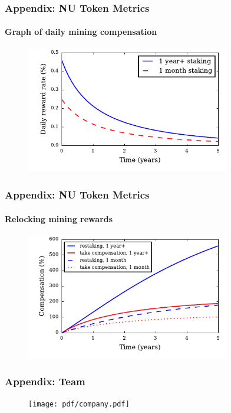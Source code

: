 \documentclass[xetex,mathsans,sans,aspectratio=169]{beamer}
\begin{document}
    \begin{frame}
        \frametitle{Appendix: NU Token Metrics}
        \framesubtitle{Graph of daily mining compensation}
        \begin{figure}
            \centering
            \includegraphics[height=5.5cm]{pdf/daily-compensation.pdf}
        \end{figure}
    \end{frame}

    \begin{frame}
        \frametitle{Appendix: NU Token Metrics}
        \framesubtitle{Relocking mining rewards}
        \begin{figure}
            \centering
            \includegraphics[height=5.5cm]{pdf/total-compensation.pdf}
        \end{figure}
    \end{frame}

    \begin{frame}
      \frametitle{Appendix: Team}
        \begin{figure}
            \centering
            \texttt{[image: pdf/company.pdf]}
        \end{figure}
    \end{frame}
\end{document}
